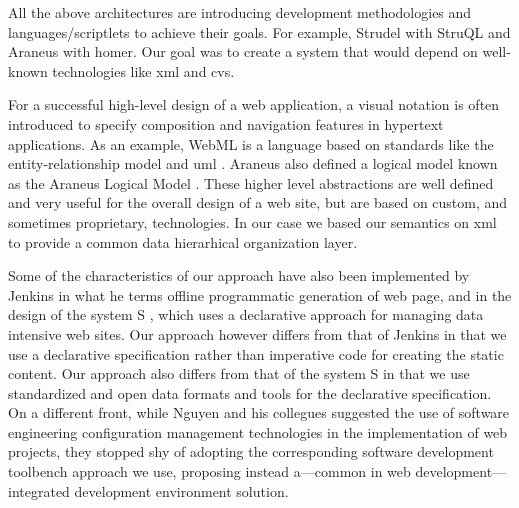 \documentclass{article}
\begin{document}
All the above architectures are introducing development methodologies and languages/scriptlets to achieve their goals. For example, Strudel with StruQL
and Araneus with homer. Our goal was to create a system
that would depend on well-known technologies like {\sc xml} and {\sc cvs}.

For a successful high-level design of a web application,
a visual notation is often introduced to specify composition and navigation features in
hypertext applications.
As an example, WebML \cite{CFB00} is a language based on standards like
the entity-relationship model \cite{Che76}
and {\sc uml} \cite{UML}.
Araneus also defined a logical model known as the Araneus Logical Model \cite{MAM03}.
These higher level abstractions are well defined and very useful for the overall design of a web site, but are based on custom,
and sometimes proprietary, technologies.
In our case we based our semantics on {\sc xml} to provide a common data hierarhical organization layer.

Some of the characteristics of our approach have also been implemented by
Jenkins \cite{Jen04} in what he terms
offline programmatic generation of web page, and in the design
of the system S \cite{SCK02}, which uses a
declarative approach for managing data intensive web sites.
Our approach however differs from that of Jenkins
in that we use a declarative specification
rather than imperative code for creating the static content.
Our approach also differs from that of the system S in that
we use standardized and open data formats and tools for the
declarative specification.
On a different front, while Nguyen and his collegues \cite{NMT04}
suggested the use of software engineering configuration management technologies
in the implementation of web projects, they stopped shy of adopting
the corresponding software development toolbench approach we use,
proposing instead a---common in web development---integrated
development environment solution.
\end{document}
